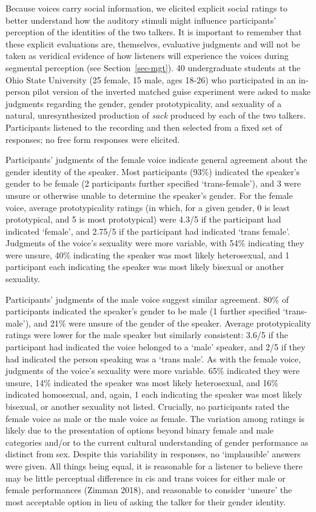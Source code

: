 \documentclass[
  letterpaper,
  DIV=11,
  numbers=noendperiod]{scrartcl}
\begin{document}
Because voices carry social information, we elicited explicit social
ratings to better understand how the auditory stimuli might influence
participants' perception of the identities of the two talkers. It is
important to remember that these explicit evaluations are, themselves,
evaluative judgments and will not be taken as veridical evidence of how
listeners will experience the voices during segmental perception (see
Section~\ref{sec-mgt}). 40 undergraduate students at the Ohio State
University (25 female, 15 male, ages 18-26) who participated in an
in-person pilot version of the inverted matched guise experiment were
asked to make judgments regarding the gender, gender prototypicality,
and sexuality of a natural, unresynthesized production of \emph{sack}
produced by each of the two talkers. Participants listened to the
recording and then selected from a fixed set of responses; no free form
responses were elicited.

Participants' judgments of the female voice indicate general agreement
about the gender identity of the speaker. Most participants (93\%)
indicated the speaker's gender to be female (2 participants further
specified `trans-female'), and 3 were unsure or otherwise unable to
determine the speaker's gender. For the female voice, average
prototypicality ratings (in which, for a given gender, 0 is least
prototypical, and 5 is most prototypical) were 4.3/5 if the participant
had indicated `female', and 2.75/5 if the participant had indicated
`trans female'. Judgments of the voice's sexuality were more variable,
with 54\% indicating they were unsure, 40\% indicating the speaker was
most likely heterosexual, and 1 participant each indicating the speaker
was most likely bisexual or another sexuality.

Participants' judgments of the male voice suggest similar agreement.
80\% of participants indicated the speaker's gender to be male (1
further specified `trans-male'), and 21\% were unsure of the gender of
the speaker. Average prototypicality ratings were lower for the male
speaker but similarly consistent: 3.6/5 if the participant had indicated
the voice belonged to a `male' speaker, and 2/5 if they had indicated
the person speaking was a `trans male'. As with the female voice,
judgments of the voice's sexuality were more variable. 65\% indicated
they were unsure, 14\% indicated the speaker was most likely
heterosexual, and 16\% indicated homosexual, and, again, 1 each
indicating the speaker was most likely bisexual, or another sexuality
not listed. Crucially, no participants rated the female voice as male or
the male voice as female. The variation among ratings is likely due to
the presentation of options beyond binary female and male categories
and/or to the current cultural understanding of gender performance as
distinct from sex. Despite this variability in responses, no
`implausible' answers were given. All things being equal, it is
reasonable for a listener to believe there may be little perceptual
difference in cis and trans voices for either male or female
performances (Zimman 2018), and reasonable to consider `unsure' the most
acceptable option in lieu of asking the talker for their gender
identity.
\end{document}
